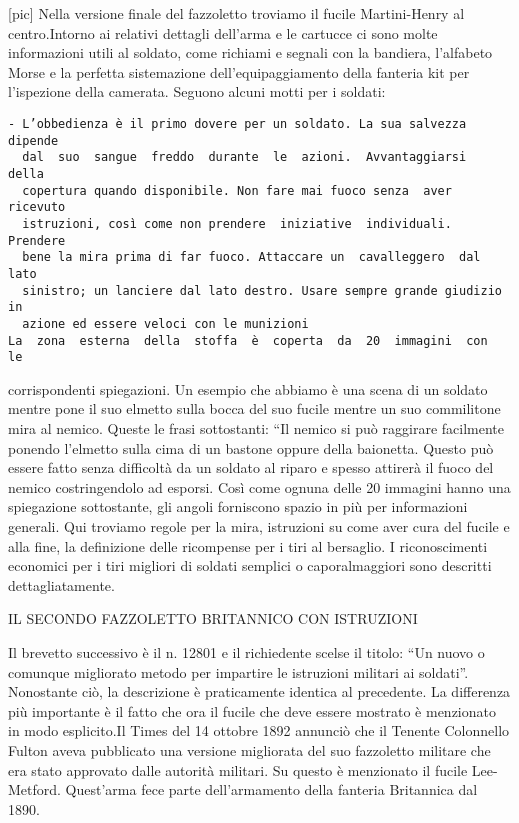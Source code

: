 {[}pic{]} Nella versione finale del fazzoletto troviamo il fucile
Martini-Henry al centro.Intorno ai relativi dettagli dell'arma e le
cartucce ci sono molte informazioni utili al soldato, come richiami e
segnali con la bandiera, l'alfabeto Morse e la perfetta sistemazione
dell'equipaggiamento della fanteria kit per l'ispezione della camerata.
Seguono alcuni motti per i soldati:

\begin{verbatim}
- L’obbedienza è il primo dovere per un soldato. La sua salvezza dipende
  dal  suo  sangue  freddo  durante  le  azioni.  Avvantaggiarsi   della
  copertura quando disponibile. Non fare mai fuoco senza  aver  ricevuto
  istruzioni, così come non prendere  iniziative  individuali.  Prendere
  bene la mira prima di far fuoco. Attaccare un  cavalleggero  dal  lato
  sinistro; un lanciere dal lato destro. Usare sempre grande giudizio in
  azione ed essere veloci con le munizioni
La  zona  esterna  della  stoffa  è  coperta  da  20  immagini  con  le
\end{verbatim}

corrispondenti spiegazioni. Un esempio che abbiamo è una scena di un
soldato mentre pone il suo elmetto sulla bocca del suo fucile mentre un
suo commilitone mira al nemico. Queste le frasi sottostanti: ``Il nemico
si può raggirare facilmente ponendo l'elmetto sulla cima di un bastone
oppure della baionetta. Questo può essere fatto senza difficoltà da un
soldato al riparo e spesso attirerà il fuoco del nemico costringendolo
ad esporsi. Così come ognuna delle 20 immagini hanno una spiegazione
sottostante, gli angoli forniscono spazio in più per informazioni
generali. Qui troviamo regole per la mira, istruzioni su come aver cura
del fucile e alla fine, la definizione delle ricompense per i tiri al
bersaglio. I riconoscimenti economici per i tiri migliori di soldati
semplici o caporalmaggiori sono descritti dettagliatamente.

IL SECONDO FAZZOLETTO BRITANNICO CON ISTRUZIONI

Il brevetto successivo è il n. 12801 e il richiedente scelse il titolo:
``Un nuovo o comunque migliorato metodo per impartire le istruzioni
militari ai soldati''. Nonostante ciò, la descrizione è praticamente
identica al precedente. La differenza più importante è il fatto che ora
il fucile che deve essere mostrato è menzionato in modo esplicito.Il
Times del 14 ottobre 1892 annunciò che il Tenente Colonnello Fulton
aveva pubblicato una versione migliorata del suo fazzoletto militare che
era stato approvato dalle autorità militari. Su questo è menzionato il
fucile Lee-Metford. Quest'arma fece parte dell'armamento della fanteria
Britannica dal 1890.

